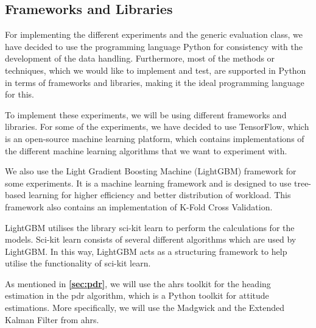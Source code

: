 
\subsection{Frameworks and Libraries}
For implementing the different experiments and the generic evaluation class, we have decided to use the programming language Python for consistency with the development of the data handling. Furthermore, most of the methods or techniques, which we would like to implement and test, are supported in Python in terms of frameworks and libraries, making it the ideal programming language for this.

To implement these experiments, we will be using different frameworks and libraries. For some of the experiments, we have decided to use TensorFlow, which is an open-source machine learning platform, which contains implementations of the different machine learning algorithms that we want to experiment with.\cite{TensorFlow}

We also use the Light Gradient Boosting Machine (LightGBM) framework for some experiments. It is a machine learning framework and is designed to use tree-based learning for higher efficiency and better distribution of workload. This framework also contains an implementation of K-Fold Cross Validation.\cite{LightGBM}

LightGBM utilises the library sci-kit learn to perform the calculations for the models. Sci-kit learn consists of several different algorithms which are used by LightGBM. In this way, LightGBM acts as a structuring framework to help utilise the functionality of sci-kit learn.\cite{scikit}

As mentioned in \textbf{\autoref{sec:pdr}}, we will use the \gls{ahrs} toolkit for the heading estimation in the \gls{pdr} algorithm, which is a Python toolkit for attitude estimations. More specifically, we will use the Madgwick and the Extended Kalman Filter from \gls{ahrs}.\cite{ahrs}


